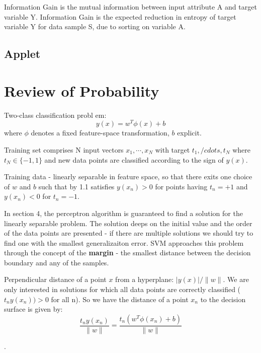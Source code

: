 \documentclass[twoside]{article}
\begin{document}
Information Gain is the mutual information between input attribute A and target variable Y. Information Gain is the expected reduction in entropy of target variable Y for data sample S, due to sorting on variable A.

\subsection{Applet}

\section{Review of Probability} 




Two-class classification probl em:
\begin{equation}
y(x) = w^T \phi(x) + b
\end{equation}
where $\phi$ denotes a fixed feature-space transformation, $ b$ explicit.

Training set comprises N input vectors $x_1, \cdots, x_N$ with target $t_1, /cdots, t_N$ where $t_N \in \{-1, 1\}$ and new data points are classified according to the sign of $y(x)$.

Training data - linearly separable in feature space, so  that there exits one choice of $w$ and $b$ such that by 1.1 satisfies $y(x_n)>0$ for points having $t_n=+1$ and $y(x_n)<0$ for $t_n=-1$.

In section 4, the perceptron algorithm is guaranteed to find a solution for the linearly separable problem. The solution deeps on the initial value and the order of the data points are presented - if there are multiple solutions we should try to find one with the smallest generalizaiton error.
SVM approaches this problem through the concept of the \textbf{margin} - the smallest distance between the decision boundary and any of the samples.

Perpendicular distance of a point $x$ from a hyperplane: $ {\lvert y(x) \rvert} / \lVert w \rVert$. We are only interested in solutions for which all data points are correctly classified ($t_n y(x_n)) >0$ for all n). So we have the distance of a point $x_n$ to the decision surface is given by:
\begin{equation}
\frac{t_ny(x_n)}{\lVert w \rVert} = \frac{t_n(w^T \phi(x_n)+b)}{\lVert w \rVert}
\end{equation}

{\color{red}{The margin is given by the perpendicular distance to the closest point $x_n$ from the data set, $w$ and $b$ need optimized in order to maximize the distance}}.
\end{document}
